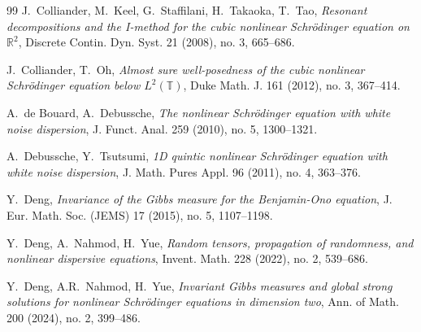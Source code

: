 \documentclass[letterpaper, 11pt,  reqno]{amsart}
\newcommand{\1}{\hspace{0.5mm}\text{I}\hspace{0.5mm}}
\newcommand{\R}{\mathbb{R}}
\newcommand{\T}{\mathbb{T}}
\numberwithin{equation}{section}
\numberwithin{theorem}{section}
\begin{document}
\begin{thebibliography}{99}
J.~Colliander, M.~Keel, G.~Staffilani, H.~Takaoka, T.~Tao,
{\it Resonant decompositions and the I-method for the cubic nonlinear Schr\"odinger equation on $\R^2$},  Discrete Contin. Dyn. Syst. 21 (2008), no. 3, 665--686. 

J.~Colliander, T.~Oh, 
{\it  Almost sure well-posedness of the cubic nonlinear Schr\"odinger equation below $L^2(\T)$}, 
Duke Math. J. 161 (2012), no. 3, 367--414. 



A.~de Bouard, A.~Debussche, 
{\it The nonlinear Schr\"odinger equation with white noise dispersion},
J. Funct. Anal. 259 (2010), no. 5, 1300--1321. 




% 
% 
% 
%
 

A.~Debussche, Y.~Tsutsumi, 
{\it 1D quintic nonlinear Schr\"odinger equation with white noise dispersion},
 J. Math. Pures Appl.  96 (2011), no. 4, 363--376. 


Y.~Deng,
{\it Invariance of the Gibbs measure for the Benjamin-Ono equation}, 
J. Eur. Math. Soc. (JEMS) 17 (2015), no. 5, 1107--1198.



   Y.~Deng, A.~Nahmod,  H.~Yue,
  {\it Random tensors, propagation of randomness, and
  nonlinear dispersive equations}, 
  Invent.
  Math. 228 (2022), no. 2, 539--686.



Y.~Deng, A.R.~Nahmod, H.~Yue,
{\it Invariant Gibbs measures and global strong solutions for nonlinear Schr\"odinger equations in dimension two},
Ann. of Math.  200 (2024), no. 2, 399--486.

 
 

\end{thebibliography}
\end{document}
